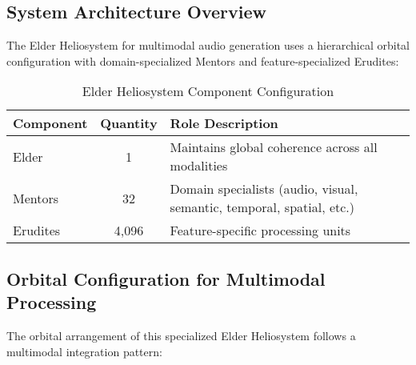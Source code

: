 \subsection{System Architecture Overview}

The Elder Heliosystem for multimodal audio generation uses a hierarchical orbital configuration with domain-specialized Mentors and feature-specialized Erudites:

\begin{table}[h]
\centering
\begin{tabular}{|l|c|l|}
\hline
\textbf{Component} & \textbf{Quantity} & \textbf{Role Description} \\
\hline
Elder & 1 & Maintains global coherence across all modalities \\
\hline
Mentors & 32 & Domain specialists (audio, visual, semantic, temporal, spatial, etc.) \\
\hline
Erudites & 4,096 & Feature-specific processing units \\
\hline
\end{tabular}
\caption{Elder Heliosystem Component Configuration}
\end{table}

\subsection{Orbital Configuration for Multimodal Processing}

The orbital arrangement of this specialized Elder Heliosystem follows a multimodal integration pattern:

